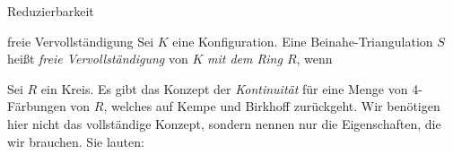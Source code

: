\begin{section}{Reduzierbarkeit}
 \begin{definition}{freie Vervollständigung}
  Sei $K$ eine Konfiguration. Eine Beinahe-Triangulation $S$ heißt \textit{freie Vervollständigung} von $K$ \textit{mit dem Ring $R$}, wenn
 \end{definition}
 
 
 
 Sei $R$ ein Kreis. Es gibt das Konzept der \textit{Kontinuität} für eine Menge von 4-Färbungen von $R$, welches auf Kempe \cite{AmJMath79} und Birkhoff \cite{AmJMath35} zurückgeht. Wir benötigen hier nicht das vollständige Konzept, sondern nennen nur die Eigenschaften, die wir brauchen. Sie lauten:

\end{section}
